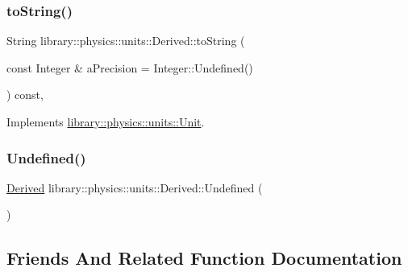 \subsubsection{\texorpdfstring{to\+String()}{toString()}}
{\footnotesize\ttfamily String library\+::physics\+::units\+::\+Derived\+::to\+String (\begin{DoxyParamCaption}\item[{const Integer \&}]{a\+Precision = {\ttfamily Integer\+:\+:Undefined()} }\end{DoxyParamCaption}) const\hspace{0.3cm}{\ttfamily [override]}, {\ttfamily [virtual]}}



Implements \hyperlink{classlibrary_1_1physics_1_1units_1_1_unit_aac05cb6ed1ea7c18c233a3381c81caf8}{library\+::physics\+::units\+::\+Unit}.

\mbox{\label{classlibrary_1_1physics_1_1units_1_1_derived_a6b6d1cdd9a736856d213504e2b04fe4c}} 
\subsubsection{\texorpdfstring{Undefined()}{Undefined()}}
{\footnotesize\ttfamily \hyperlink{classlibrary_1_1physics_1_1units_1_1_derived}{Derived} library\+::physics\+::units\+::\+Derived\+::\+Undefined (\begin{DoxyParamCaption}{ }\end{DoxyParamCaption})\hspace{0.3cm}{\ttfamily [static]}}



\subsection{Friends And Related Function Documentation}
\mbox{\label{classlibrary_1_1physics_1_1units_1_1_derived_a033deb6664987f4b2f86f5abeb18da81}} 
